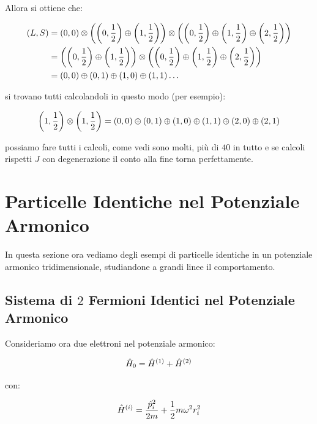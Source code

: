\begin{itemize}
		Allora si ottiene che:
	
	\begin{align*}
		\qty(L, S) & =  \qty(0, 0) \otimes \qty(\qty(0, \frac{1}{2} ) \oplus \qty(1, \frac{1}{2} )) \otimes \qty( \qty(0, \frac{1}{2} ) \oplus \qty(1, \frac{1}{2} ) \oplus \qty(2, \frac{1}{2})) \\
		& = \qty(\qty(0, \frac{1}{2} ) \oplus \qty(1, \frac{1}{2} )) \otimes \qty( \qty(0, \frac{1}{2} ) \oplus \qty(1, \frac{1}{2} ) \oplus \qty(2, \frac{1}{2})) \\
		& = \qty(0, 0) \oplus \qty(0, 1) \oplus \qty(1, 0) \oplus \qty(1, 1) \dots
	\end{align*}
\end{itemize}

		si trovano tutti calcolandoli in questo modo (per esempio):
	
	\begin{align*}
		\qty(1, \frac{1}{2} ) \otimes \qty(1, \frac{1}{2}) = \qty(0, 0) \oplus \qty(0, 1) \oplus \qty(1, 0) \oplus \qty(1, 1) \oplus \qty(2, 0) \oplus \qty(2, 1)
	\end{align*}
 
 		possiamo fare tutti i calcoli, come vedi sono molti, più di $40$ in tutto e se calcoli rispetti $J$ con degenerazione il conto alla fine torna perfettamente.
		
\section{Particelle Identiche nel Potenziale Armonico}

	In questa sezione ora vediamo degli esempi di particelle identiche in un potenziale armonico tridimensionale, studiandone a grandi linee il comportamento.

\subsection{Sistema di $2$ Fermioni Identici nel Potenziale Armonico}

	Consideriamo ora due elettroni nel potenziale armonico:
	
\begin{align*}
	\hat{H}_0 = \hat{H}^{\qty(1)} + \hat{H}^{\qty(2)}
\end{align*}
	
	con:
	
\begin{align*}
	\hat{H}^{\qty(i)} = \frac{\hat{p}^2_i}{2m} + \frac{1}{2} m \omega^2 r_i^2
\end{align*}
	
